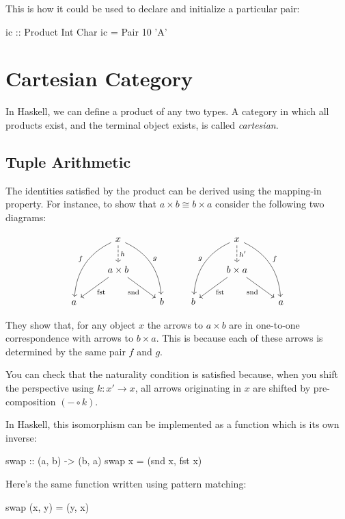 \documentclass[DaoFP]{subfiles}
\begin{document}
This is how it could be used to declare and initialize a particular pair:
\begin{haskell}
ic :: Product Int Char
ic = Pair 10 'A'
\end{haskell}

\section{Cartesian Category}

In Haskell, we can define a product of any two types. A category in which all products exist, and the terminal object exists, is called \emph{cartesian}. 

\subsection{Tuple Arithmetic}

The identities satisfied by the product can be derived using the mapping-in property. For instance, to show that $a \times b \cong b \times a$ consider the following two diagrams:

\[
 \begin{tikzcd}
 &x
 \arrow[d, dashed, "h"]
 \arrow[ddl, bend right, "f"']
 \arrow[ddr, bend left, "g"]
 \\
 & a \times b
  \arrow[dl,  "\text{fst}"]
 \arrow[dr,   "\text{snd}"']
 \\
a && b
 \end{tikzcd}
 \qquad
 \begin{tikzcd}
 &x
 \arrow[d, dashed, "h'"]
 \arrow[ddl, bend right, "g"']
 \arrow[ddr, bend left, "f"]
 \\
 & b \times a
  \arrow[dl,  "\text{fst}"]
 \arrow[dr,   "\text{snd}"']
\\
b && a
  \end{tikzcd}
\]

They show that, for any object $x$ the arrows to $a \times b$ are in one-to-one correspondence with arrows to $b \times a$. This is because each of these arrows is determined by the same pair $f$ and $g$. 

You can check that the naturality condition is satisfied because, when you shift the perspective using $k \colon x' \to x$, all arrows originating in $x$ are shifted by pre-composition $(- \circ k)$.

In Haskell, this isomorphism can be implemented as a function which is its own inverse:
\begin{haskell}
swap :: (a, b) -> (b, a)
swap x = (snd x, fst x)
\end{haskell}
Here's the same function written using pattern matching:
\begin{haskell}
swap (x, y) = (y, x)
\end{haskell}
\end{document}
